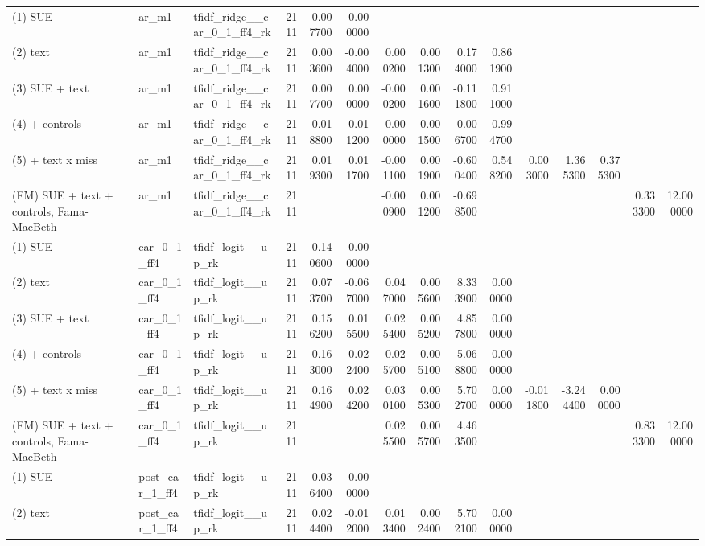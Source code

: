 \begin{table}
\begin{tabular}{lllrrrrrrrrrrrr}
(1) SUE & ar\_m1 & tfidf\_ridge\_\_car\_0\_1\_ff4\_rk & 2111 & 0.007700 & 0.000000 &  &  &  &  &  &  &  &  &  \\
(2) text & ar\_m1 & tfidf\_ridge\_\_car\_0\_1\_ff4\_rk & 2111 & 0.003600 & -0.004000 & 0.000200 & 0.001300 & 0.174000 & 0.861900 &  &  &  &  &  \\
(3) SUE + text & ar\_m1 & tfidf\_ridge\_\_car\_0\_1\_ff4\_rk & 2111 & 0.007700 & 0.000000 & -0.000200 & 0.001600 & -0.111800 & 0.911000 &  &  &  &  &  \\
(4) + controls & ar\_m1 & tfidf\_ridge\_\_car\_0\_1\_ff4\_rk & 2111 & 0.018800 & 0.011200 & -0.000000 & 0.001500 & -0.006700 & 0.994700 &  &  &  &  &  \\
(5) + text x miss & ar\_m1 & tfidf\_ridge\_\_car\_0\_1\_ff4\_rk & 2111 & 0.019300 & 0.011700 & -0.001100 & 0.001900 & -0.600400 & 0.548200 & 0.003000 & 1.365300 & 0.375300 &  &  \\
(FM) SUE + text + controls, Fama-MacBeth & ar\_m1 & tfidf\_ridge\_\_car\_0\_1\_ff4\_rk & 2111 &  &  & -0.000900 & 0.001200 & -0.698500 &  &  &  &  & 0.333300 & 12.000000 \\
(1) SUE & car\_0\_1\_ff4 & tfidf\_logit\_\_up\_rk & 2111 & 0.140600 & 0.000000 &  &  &  &  &  &  &  &  &  \\
(2) text & car\_0\_1\_ff4 & tfidf\_logit\_\_up\_rk & 2111 & 0.073700 & -0.067000 & 0.047000 & 0.005600 & 8.333900 & 0.000000 &  &  &  &  &  \\
(3) SUE + text & car\_0\_1\_ff4 & tfidf\_logit\_\_up\_rk & 2111 & 0.156200 & 0.015500 & 0.025400 & 0.005200 & 4.857800 & 0.000000 &  &  &  &  &  \\
(4) + controls & car\_0\_1\_ff4 & tfidf\_logit\_\_up\_rk & 2111 & 0.163000 & 0.022400 & 0.025700 & 0.005100 & 5.068800 & 0.000000 &  &  &  &  &  \\
(5) + text x miss & car\_0\_1\_ff4 & tfidf\_logit\_\_up\_rk & 2111 & 0.164900 & 0.024200 & 0.030100 & 0.005300 & 5.702700 & 0.000000 & -0.011800 & -3.244400 & 0.000000 &  &  \\
(FM) SUE + text + controls, Fama-MacBeth & car\_0\_1\_ff4 & tfidf\_logit\_\_up\_rk & 2111 &  &  & 0.025500 & 0.005700 & 4.463500 &  &  &  &  & 0.833300 & 12.000000 \\
(1) SUE & post\_car\_1\_ff4 & tfidf\_logit\_\_up\_rk & 2111 & 0.036400 & 0.000000 &  &  &  &  &  &  &  &  &  \\
(2) text & post\_car\_1\_ff4 & tfidf\_logit\_\_up\_rk & 2111 & 0.024400 & -0.012000 & 0.013400 & 0.002400 & 5.702100 & 0.000000 &  &  &  &  &  \\

\end{tabular}
\end{table}
